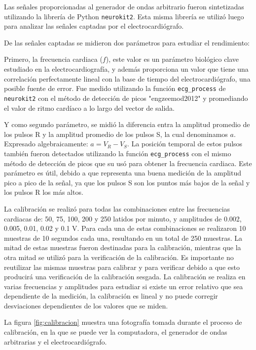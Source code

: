 \documentclass[conference]{IEEEtran}
\begin{document}
Las señales proporcionadas al generador de ondas arbitrario fueron sintetizadas 
utilizando la librería de Python \texttt{neurokit2}. \cite{neurokit2}
Esta misma librería se utilizó luego para analizar las señales captadas por el
electrocardiógrafo.

De las señales captadas se midieron dos parámetros para estudiar el rendimiento:

Primero, la frecuencia cardiaca ($f$), este valor es un parámetro biológico clave estudiado
en la electrocardiografía, y además proporciona un valor que tiene una correlación
perfectamente lineal con la base de tiempo del electrocardiógrafo, una posible fuente
de error. Fue medido utilizando la función \texttt{ecg\_process} de \texttt{neurokit2}
con  el método de detección de picos "engzeemod2012" y promediando el valor de ritmo
cardíaco a lo largo del vector de salida.

Y como segundo parámetro, se midió la diferencia entra la amplitud promedio de los
pulsos R y la amplitud promedio de los pulsos S, la cual denominamos $a$. Expresado
algebraicamente: $a = V_R - V_S$.
La posición temporal de estos pulsos también fueron detectados
utilizando la función \texttt{ecg\_process} con el mismo método de detección de picos
que su usó para obtener la frecuencia cardiaca. Este parámetro es útil, debido a que
representa una buena medición de la amplitud pico a pico de la señal, ya que los
pulsos S son los puntos más bajos de la señal y los pulsos R los más altos.

La calibración se realizó para todas las combinaciones entre las frecuencias
cardiacas de: 50, 75, 100, 200 y 250 latidos por minuto, y amplitudes de 0.002,
0.005, 0.01, 0.02 y 0.1 V. 
Para cada una de estas combinaciones se realizaron 10 muestras de 10 segundos cada
una, resultando en un total de 250 muestras. La mitad de estas muestras fueron
destinadas para la calibración, mientras que la otra  mitad se utilizó para la
verificación de la calibración. Es importante no reutilizar las mismas muestras para
calibrar y para verificar debido a que esto producirá una verificación de la
calibración sesgada.
La calibración se realiza en varias frecuencias y amplitudes
para estudiar si existe un error relativo que sea dependiente de la medición,
la calibración es lineal y no puede corregir desviaciones dependientes de los valores que
se miden.



La figura \ref{fig:calibracion} muestra una fotografía tomada
durante el proceso de calibración, en la que se puede ver la computadora, el generador
de ondas arbitrarias y el electrocardiógrafo.
\end{document}
